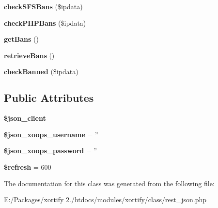 \begin{DoxyCompactItemize}
\item 
\hypertarget{class_r_e_s_t___j_s_o_n_xortify_exchange_a332c2ae4230528a4a84a82e445e8676d}{{\bfseries check\-S\-F\-S\-Bans} (\$ipdata)}\label{class_r_e_s_t___j_s_o_n_xortify_exchange_a332c2ae4230528a4a84a82e445e8676d}

\item 
\hypertarget{class_r_e_s_t___j_s_o_n_xortify_exchange_a29bbf0bc907df90d603680e11c5c564a}{{\bfseries check\-P\-H\-P\-Bans} (\$ipdata)}\label{class_r_e_s_t___j_s_o_n_xortify_exchange_a29bbf0bc907df90d603680e11c5c564a}

\item 
\hypertarget{class_r_e_s_t___j_s_o_n_xortify_exchange_ac5cc8b57fe546a79d4d5591efb554809}{{\bfseries get\-Bans} ()}\label{class_r_e_s_t___j_s_o_n_xortify_exchange_ac5cc8b57fe546a79d4d5591efb554809}

\item 
\hypertarget{class_r_e_s_t___j_s_o_n_xortify_exchange_a836efe279696510e1adfbf1c6e7f3286}{{\bfseries retrieve\-Bans} ()}\label{class_r_e_s_t___j_s_o_n_xortify_exchange_a836efe279696510e1adfbf1c6e7f3286}

\item 
\hypertarget{class_r_e_s_t___j_s_o_n_xortify_exchange_a931c5d5f90b20f7ecb66b34076886edc}{{\bfseries check\-Banned} (\$ipdata)}\label{class_r_e_s_t___j_s_o_n_xortify_exchange_a931c5d5f90b20f7ecb66b34076886edc}

\end{DoxyCompactItemize}
\subsection*{Public Attributes}
\begin{DoxyCompactItemize}
\item 
\hypertarget{class_r_e_s_t___j_s_o_n_xortify_exchange_adcea2c0ce5c81dc38cb1b52e40918717}{{\bfseries \$json\-\_\-client}}\label{class_r_e_s_t___j_s_o_n_xortify_exchange_adcea2c0ce5c81dc38cb1b52e40918717}

\item 
\hypertarget{class_r_e_s_t___j_s_o_n_xortify_exchange_aeffd57ee317ac7eb898050a477bdd4da}{{\bfseries \$json\-\_\-xoops\-\_\-username} = ''}\label{class_r_e_s_t___j_s_o_n_xortify_exchange_aeffd57ee317ac7eb898050a477bdd4da}

\item 
\hypertarget{class_r_e_s_t___j_s_o_n_xortify_exchange_ae33e984ae0fe2c5af273f943aa822ea5}{{\bfseries \$json\-\_\-xoops\-\_\-password} = ''}\label{class_r_e_s_t___j_s_o_n_xortify_exchange_ae33e984ae0fe2c5af273f943aa822ea5}

\item 
\hypertarget{class_r_e_s_t___j_s_o_n_xortify_exchange_abb0badd6352c3c81fee3f62ad1b992e7}{{\bfseries \$refresh} = 600}\label{class_r_e_s_t___j_s_o_n_xortify_exchange_abb0badd6352c3c81fee3f62ad1b992e7}

\end{DoxyCompactItemize}


The documentation for this class was generated from the following file\-:\begin{DoxyCompactItemize}
\item 
E\-:/\-Packages/xortify 2./htdocs/modules/xortify/class/rest\-\_\-json.\-php\end{DoxyCompactItemize}
